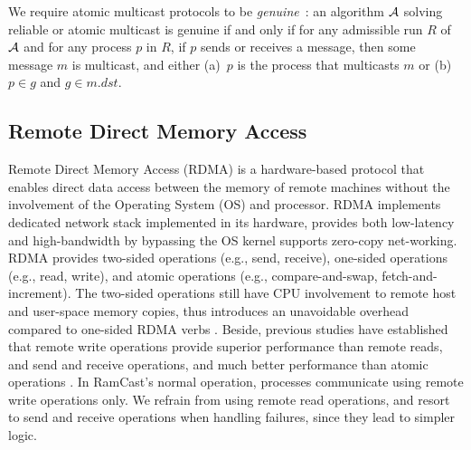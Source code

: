 We require atomic multicast protocols to be \emph{genuine}~\cite{GS01b}: 
an algorithm ${\cal A}$ solving reliable or atomic multicast is genuine
if and only if for any admissible run $R$ of ${\cal A}$ and for any process $p$ in $R$, if $p$ sends or receives a message, then some message $m$ is multicast, and either (a)~$p$ is the process that multicasts $m$ or (b)~$p \in g$ and $g \in m.dst$.


\subsection{Remote Direct Memory Access}
\label{sec:rdma}

Remote Direct Memory Access (RDMA) is a hardware-based protocol that enables direct data access between the memory of remote machines without the involvement of the Operating System (OS) and processor. 
RDMA implements dedicated network stack implemented in its hardware, provides both low-latency and high-bandwidth by bypassing the OS kernel supports zero-copy net-working.
RDMA provides two-sided operations (e.g., send, receive), one-sided operations (e.g., read, write), and atomic operations (e.g., compare-and-swap, fetch-and-increment). The two-sided operations still have CPU involvement to remote host and user-space memory copies, thus introduces an unavoidable overhead compared to one-sided RDMA verbs \cite{FaRM}.
Beside, previous studies have established that remote write operations provide superior performance than remote reads, and send and receive operations, and much better performance than atomic operations \cite{kalia2014using, kalia2016design, mitchell2013using}.
In RamCast's normal operation, processes communicate using remote write operations only.
We refrain from using remote read operations, and resort to send and receive operations when handling failures, since they lead to simpler logic.

